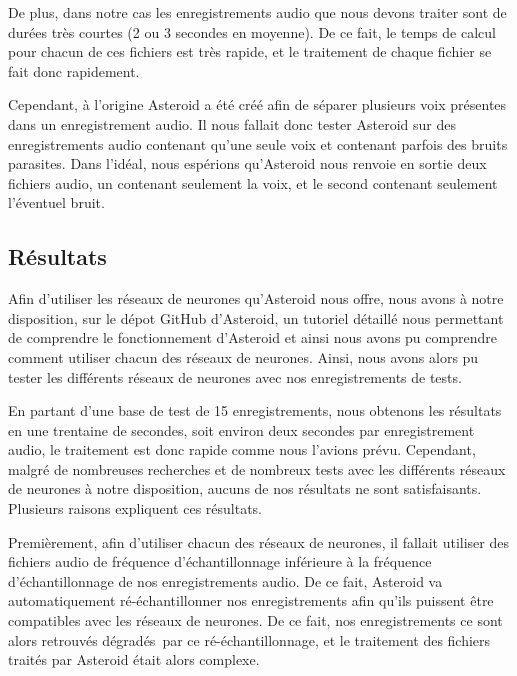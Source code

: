 \documentclass{article}
\begin{document}
De plus, dans notre cas les enregistrements audio que nous devons traiter sont de durées très courtes (2 ou 3 secondes en moyenne). De ce fait, le temps de calcul pour chacun de ces fichiers est très rapide, et le traitement de chaque fichier se fait donc rapidement.
 
Cependant, à l'origine Asteroid a été créé afin de séparer plusieurs voix présentes dans un enregistrement audio. Il nous fallait donc tester Asteroid sur des enregistrements audio contenant qu'une seule voix et contenant parfois des bruits parasites. Dans l'idéal, nous espérions qu'Asteroid nous renvoie en sortie deux fichiers audio, un contenant seulement la voix, et le second contenant seulement l'éventuel bruit.

\subsection{Résultats}

Afin d'utiliser les réseaux de neurones qu'Asteroid nous offre, nous avons à notre disposition, sur le dépot GitHub d'Asteroid, un tutoriel détaillé nous permettant de comprendre le fonctionnement d'Asteroid et ainsi nous avons pu comprendre comment utiliser chacun des réseaux de neurones. Ainsi, nous avons alors pu tester les différents réseaux de neurones avec nos enregistrements de tests.

En partant d'une base de test de 15 enregistrements, nous obtenons les résultats en une trentaine de secondes, soit environ deux secondes par enregistrement audio, le traitement est donc rapide comme nous l'avions prévu.
Cependant, malgré de nombreuses recherches et de nombreux tests avec les différents réseaux de neurones à notre disposition, aucuns de nos résultats ne sont satisfaisants. Plusieurs raisons expliquent ces résultats.

Premièrement, afin d'utiliser chacun des réseaux de neurones, il fallait utiliser des fichiers audio de fréquence d'échantillonnage inférieure à la fréquence d'échantillonnage de nos enregistrements audio. De ce fait, Asteroid va automatiquement ré-échantillonner nos enregistrements afin qu'ils puissent être compatibles avec les réseaux de neurones. De ce fait, nos enregistrements ce sont alors retrouvés \og dégradés\fg\ par ce ré-échantillonnage, et le traitement des fichiers traités par Asteroid était alors complexe. 
\end{document}
